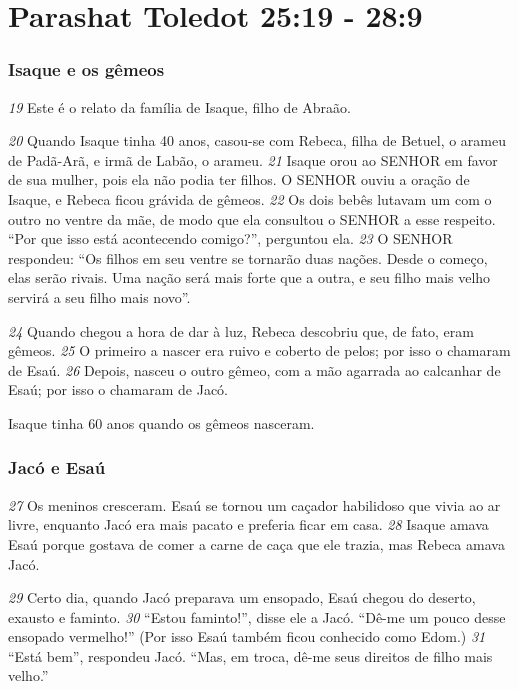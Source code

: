 \section*{Parashat Toledot 25:19 - 28:9}

\subsubsection*{Isaque e os gêmeos}

\textit{\tiny 19}
Este é o relato da família de Isaque, filho de Abraão. 

\bigskip
\textit{\tiny 20}
Quando Isaque tinha 40 anos, casou-se com Rebeca, filha de Betuel, o arameu de Padã-Arã, e irmã de
Labão, o arameu.
\textit{\tiny 21}
Isaque orou ao SENHOR em favor de sua mulher, pois ela não podia ter filhos.
O SENHOR ouviu a oração de Isaque, e Rebeca ficou grávida de gêmeos. 
\textit{\tiny 22}
Os dois
bebês lutavam um com o outro no ventre da mãe, de modo que ela consultou o
SENHOR a esse respeito. “Por que isso está acontecendo comigo?”, perguntou ela.
\textit{\tiny 23}
O SENHOR respondeu: “Os filhos em seu ventre se tornarão duas nações.
Desde o começo, elas serão rivais. Uma nação será mais forte que a outra, e seu
filho mais velho servirá a seu filho mais novo”.
   
\bigskip
\textit{\tiny 24}
Quando chegou a hora de dar à luz, Rebeca descobriu que, de fato, eram
gêmeos. 
\textit{\tiny 25}
O primeiro a nascer era ruivo e coberto de pelos; por isso o chamaram
de Esaú. 
\textit{\tiny 26}
Depois, nasceu o outro gêmeo, com a mão agarrada ao calcanhar de
Esaú; por isso o chamaram de Jacó. 

\bigskip
Isaque tinha 60 anos quando os gêmeos
nasceram.



\subsubsection*{Jacó e Esaú}

\textit{\tiny 27}
Os meninos cresceram. Esaú se tornou um caçador habilidoso que vivia ao ar
livre, enquanto Jacó era mais pacato e preferia ficar em casa. 
\textit{\tiny 28}
Isaque amava Esaú
porque gostava de comer a carne de caça que ele trazia, mas Rebeca amava Jacó.

\bigskip   
\textit{\tiny 29}
Certo dia, quando Jacó preparava um ensopado, Esaú chegou do deserto,
exausto e faminto. 
\textit{\tiny 30}
“Estou faminto!”, disse ele a Jacó. “Dê-me um pouco desse
ensopado vermelho!” (Por isso Esaú também ficou conhecido como Edom.)
\textit{\tiny 31}
“Está bem”, respondeu Jacó. “Mas, em troca, dê-me seus direitos de filho mais
velho.”
   
